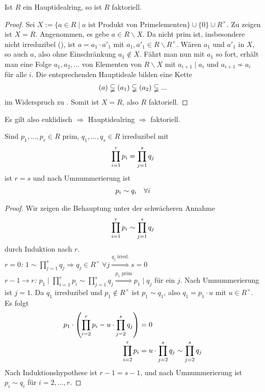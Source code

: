 \begin{proposition}
	Ist $R$ ein Hauptidealring, so ist $R$ faktoriell.
\end{proposition}
\begin{proof}
	Sei $X:=\{a\in R\mid a\text{ ist Produkt von Primelementen}\}\cup \{0\}\cup R^\times$. Zu zeigen ist $X=R$. Angenommen, es gebe $a\in R\backslash X$. Da nicht prim ist, insbesondere nicht irreduzibel (), ist $a=a_1\cdot a'_1$ mit $a_1,a'_1\in R\backslash R^\times$. Wären $a_1$ und $a'_1$ in $X$, so auch $a$, also ohne Einschränkung $a_1\notin X$. Fährt man nun mit $a_1$ so fort, erhält man eine Folge $a_1,a_2,...$ von Elementen von $R\backslash X$ mit $a_{i+1}\mid a_i$ und $a_{i+1}\nsim a_i$ für alle $i$. Die entsprechenden Hauptideale bilden eine Kette
	\begin{align}
		(a)\subsetneqq (a_1)\subsetneqq (a_2)\subsetneqq ...\notag
	\end{align}
	im Widerspruch zu . Somit ist $X=R$, also $R$ faktoriell.
\end{proof}

\begin{*anmerkung}
	Es gilt also euklidisch $\Rightarrow$ Hauptidealring $\Rightarrow$ faktoriell.
\end{*anmerkung}

\begin{lemma}
	Sind $p_1,...,p_r\in R$ prim, $q_1,...,q_s\in R$ irreduzibel mit 
	\begin{align}
		\prod_{i=1}^r p_i = \prod_{j=1}^s q_j \notag
	\end{align}
	ist $r=s$ und nach Umnummerierung ist
	\begin{align}
		p_i\sim q_i\quad\forall i\notag
	\end{align}
\end{lemma}
\begin{proof}
	Wir zeigen die Behauptung unter der schwächeren Annahme 
	\begin{align}
	\prod_{i=1}^r p_i \sim \prod_{j=1}^s q_j \notag
	\end{align}
	durch Induktion nach $r$. \\
	\emph{$r=0$:} $1\sim\prod_{j=1}^s q_j\Rightarrow q_j\in R^\times\;\forall j\overset{q_j\text{ irred.}}{\Rightarrow} s=0$ \\
	\emph{$r-1\to r$:} $p_1\mid \prod_{i=1}^r p_i\sim \prod_{j=1}^s q_j\overset{p_1 \text{ prim}}{\Rightarrow} p_1\mid q_j$ für ein $j$. Nach Umnummerierung ist $j=1$. Da $q_1$ irreduzibel und $p_1\notin R^\times$ ist $p_1\sim q_1$, also $q_1=p_1\cdot u$ mit $u\in R^\times$. Es folgt
	\begin{align}
		p_1\cdot \left(\prod_{i=2}^r p_i-u\cdot \prod_{j=2}^s q_j\right)&=0\notag \\
		\prod_{i=2}^r p_i &= u\cdot \prod_{j=2}^s q_j\sim \prod_{j=2}^s q_j\notag
	\end{align}
	Nach Induktionshypothese ist $r-1=s-1$, und nach Umnummerierung ist $p_i\sim q_i$ für $i=2,...,r$.
\end{proof}

